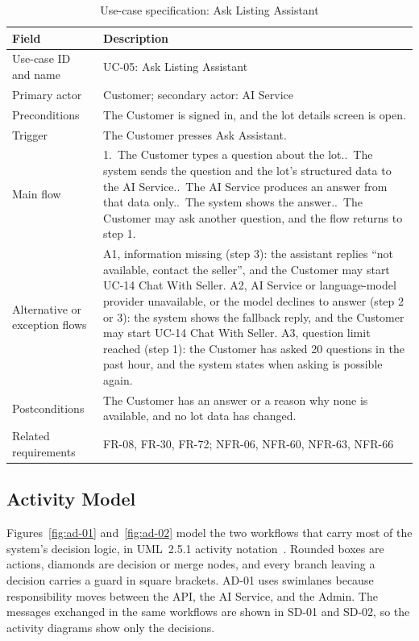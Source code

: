 \begin{table}[H]
\centering
\caption{Use-case specification: Ask Listing Assistant}
\label{tab:uc-ask-assistant}
\footnotesize
\begin{tabularx}{\textwidth}{@{}p{}X@{}}
\toprule
\textbf{Field} & \textbf{Description} \\
\midrule
Use-case ID and name & UC-05: Ask Listing Assistant \\
Primary actor & Customer; secondary actor: AI Service \\
Preconditions & The Customer is signed in, and the lot details screen is open. \\
Trigger & The Customer presses Ask Assistant. \\
Main flow & 1.~The Customer types a question about the lot.\newline
2.~The system sends the question and the lot's structured data to the AI Service.\newline
3.~The AI Service produces an answer from that data only.\newline
4.~The system shows the answer.\newline
5.~The Customer may ask another question, and the flow returns to step 1. \\
Alternative or exception flows & A1, information missing (step 3): the assistant replies ``not available, contact the seller'', and the Customer may start UC-14 Chat With Seller.\newline
A2, AI Service or language-model provider unavailable, or the model declines to answer (step 2 or 3): the system shows the fallback reply, and the Customer may start UC-14 Chat With Seller.\newline
A3, question limit reached (step 1): the Customer has asked 20 questions in the past hour, and the system states when asking is possible again. \\
Postconditions & The Customer has an answer or a reason why none is available, and no lot data has changed. \\
Related requirements & FR-08, FR-30, FR-72; NFR-06, NFR-60, NFR-63, NFR-66 \\
\bottomrule
\end{tabularx}
\end{table}

\subsection{Activity Model}
Figures~\ref{fig:ad-01} and~\ref{fig:ad-02} model the two workflows that carry
most of the system's decision logic, in UML~2.5.1 activity notation~\citep{omguml251}.
Rounded boxes are actions, diamonds are decision or merge nodes, and every branch
leaving a decision carries a guard in square brackets. AD-01 uses swimlanes because
responsibility moves between the API, the AI Service, and the Admin. The messages
exchanged in the same workflows are shown in SD-01 and SD-02, so the activity
diagrams show only the decisions.

